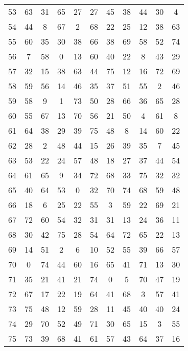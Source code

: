\begin{table}
\begin{tabular}{c c c c c c c c c c c }
53 & 63 & 31 & 65 & 27 & 27 & 45 & 38 & 44 & 30 & 4 \\
54 & 44 & 8 & 67 & 2 & 68 & 22 & 25 & 12 & 38 & 63 \\
55 & 60 & 35 & 30 & 38 & 66 & 38 & 69 & 58 & 52 & 74 \\
56 & 7 & 58 & 0 & 13 & 60 & 40 & 22 & 8 & 43 & 29 \\
57 & 32 & 15 & 38 & 63 & 44 & 75 & 12 & 16 & 72 & 69 \\
58 & 59 & 56 & 14 & 46 & 35 & 37 & 51 & 55 & 2 & 46 \\
59 & 58 & 9 & 1 & 73 & 50 & 28 & 66 & 36 & 65 & 28 \\
60 & 55 & 67 & 13 & 70 & 56 & 21 & 50 & 4 & 61 & 8 \\
61 & 64 & 38 & 29 & 39 & 75 & 48 & 8 & 14 & 60 & 22 \\
62 & 28 & 2 & 48 & 44 & 15 & 26 & 39 & 35 & 7 & 45 \\
63 & 53 & 22 & 24 & 57 & 48 & 18 & 27 & 37 & 44 & 54 \\
64 & 61 & 65 & 9 & 34 & 72 & 68 & 33 & 75 & 32 & 32 \\
65 & 40 & 64 & 53 & 0 & 32 & 70 & 74 & 68 & 59 & 48 \\
66 & 18 & 6 & 25 & 22 & 55 & 3 & 59 & 22 & 69 & 21 \\
67 & 72 & 60 & 54 & 32 & 31 & 31 & 13 & 24 & 36 & 11 \\
68 & 30 & 42 & 75 & 28 & 54 & 64 & 72 & 65 & 22 & 13 \\
69 & 14 & 51 & 2 & 6 & 10 & 52 & 55 & 39 & 66 & 57 \\
70 & 0 & 74 & 44 & 60 & 16 & 65 & 41 & 71 & 13 & 30 \\
71 & 35 & 21 & 41 & 21 & 74 & 0 & 5 & 70 & 47 & 19 \\
72 & 67 & 17 & 22 & 19 & 64 & 41 & 68 & 3 & 57 & 41 \\
73 & 75 & 48 & 12 & 59 & 28 & 11 & 45 & 40 & 40 & 24 \\
74 & 29 & 70 & 52 & 49 & 71 & 30 & 65 & 15 & 3 & 55 \\
75 & 73 & 39 & 68 & 41 & 61 & 57 & 43 & 64 & 37 & 16 \\
\hline
\end{tabular}
\end{table}